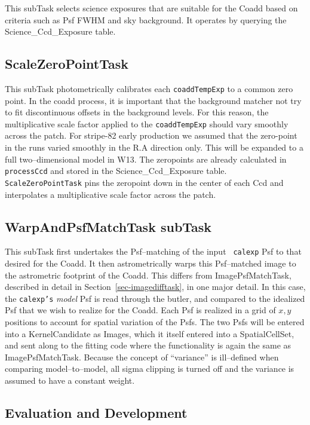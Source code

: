 \documentclass[prd, nofootinbib, floatfix, 11pt,tightenlines,times]{article}
\begin{document}
This subTask selects science exposures that are suitable for the Coadd
based on criteria such as Psf FWHM and sky background. It operates by
querying the Science\_Ccd\_Exposure table.

\subsection{ScaleZeroPointTask} 

This subTask photometrically calibrates each {\tt coaddTempExp} to a
common zero point.  In the coadd process, it is important that the
background matcher not try to fit discontinuous offsets in the
background levels. For this reason, the multiplicative scale factor
applied to the {\tt coaddTempExp} should vary smoothly across the
patch. For stripe-82 early production we assumed that the zero-point
in the runs varied smoothly in the R.A direction only.  This will be
expanded to a full two--dimensional model in W13.  The zeropoints are
already calculated in {\tt processCcd} and stored in the
Science\_Ccd\_Exposure table. {\tt ScaleZeroPointTask} pins the
zeropoint down in the center of each Ccd and interpolates a
multiplicative scale factor across the patch.

\subsection{WarpAndPsfMatchTask subTask} 

This subTask first undertakes the Psf--matching of the input {\tt
  calexp} Psf to that desired for the Coadd.  It then astrometrically
warps this Psf--matched image to the astrometric footprint of the
Coadd.  This differs from ImagePsfMatchTask, described in detail in
Section~\ref{sec-imagedifftask}, in one major detail.  In this case,
the {\tt calexp's} {\it model} Psf is read through the butler, and
compared to the idealized Psf that we wish to realize for the Coadd.
Each Psf is realized in a grid of $x,y$ positions to account for
spatial variation of the Psfs.  The two Psfs will be entered into a
KernelCandidate as Images, which it itself entered into a
SpatialCellSet, and sent along to the fitting code where the
functionality is again the same as ImagePsfMatchTask.  Because the
concept of ``variance'' is ill--defined when comparing
model--to--model, all sigma clipping is turned off and the variance is
assumed to have a constant weight.


\subsection{Evaluation and Development}
\end{document}
